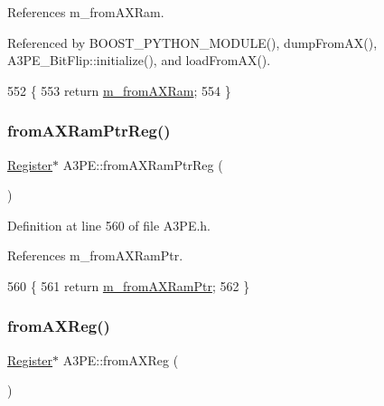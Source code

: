References m\+\_\+from\+A\+X\+Ram.



Referenced by B\+O\+O\+S\+T\+\_\+\+P\+Y\+T\+H\+O\+N\+\_\+\+M\+O\+D\+U\+L\+E(), dump\+From\+A\+X(), A3\+P\+E\+\_\+\+Bit\+Flip\+::initialize(), and load\+From\+A\+X().


\begin{DoxyCode}
552                   \{
553     \textcolor{keywordflow}{return} \hyperlink{classA3PE_a91d3dd3e87e2c948dd67cb82a63d3858}{m\_fromAXRam};
554   \}
\end{DoxyCode}
\mbox{\label{classA3PE_aad21357e25e3d4e2bed779040de52e13}} 
\subsubsection{\texorpdfstring{from\+A\+X\+Ram\+Ptr\+Reg()}{fromAXRamPtrReg()}}
{\footnotesize\ttfamily \hyperlink{classRegister}{Register}$\ast$ A3\+P\+E\+::from\+A\+X\+Ram\+Ptr\+Reg (\begin{DoxyParamCaption}{ }\end{DoxyParamCaption})\hspace{0.3cm}{\ttfamily [inline]}}



Definition at line 560 of file A3\+P\+E.\+h.



References m\+\_\+from\+A\+X\+Ram\+Ptr.


\begin{DoxyCode}
560                              \{
561     \textcolor{keywordflow}{return} \hyperlink{classA3PE_a27ae9467bc128e46dd80443245df096a}{m\_fromAXRamPtr};
562   \}
\end{DoxyCode}
\mbox{\label{classA3PE_a0b2fabe7e7941f33de210d9385b7afce}} 
\subsubsection{\texorpdfstring{from\+A\+X\+Reg()}{fromAXReg()}}
{\footnotesize\ttfamily \hyperlink{classRegister}{Register}$\ast$ A3\+P\+E\+::from\+A\+X\+Reg (\begin{DoxyParamCaption}{ }\end{DoxyParamCaption})\hspace{0.3cm}{\ttfamily [inline]}}



